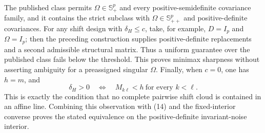 The published class permits \(\Omega\in\mathbb S_+^p\) and every positive-semidefinite covariance family, and it contains the strict subclass with \(\Omega\in\mathbb S_{++}^p\) and positive-definite covariances.  For any shift design with \(\delta_H\le c\), take, for example, \(D=I_p\) and \(\Omega=I_p\); then the preceding construction supplies positive-definite replacements and a second admissible structural matrix.  Thus a uniform guarantee over the published class fails below the threshold.  This proves minimax sharpness without asserting ambiguity for a preassigned singular \(\Omega\).  Finally, when \(c=0\), one has \(h=m\), and
\[
 \delta_H>0
 \quad\Longleftrightarrow\quad
 M_{k\ell}<h\ \text{for every }k<\ell.
\]
This is exactly the condition that no complete pairwise shift cloud is contained in an affine line.  Combining this observation with (14) and the fixed-interior converse proves the stated equivalence on the positive-definite invariant-noise interior.